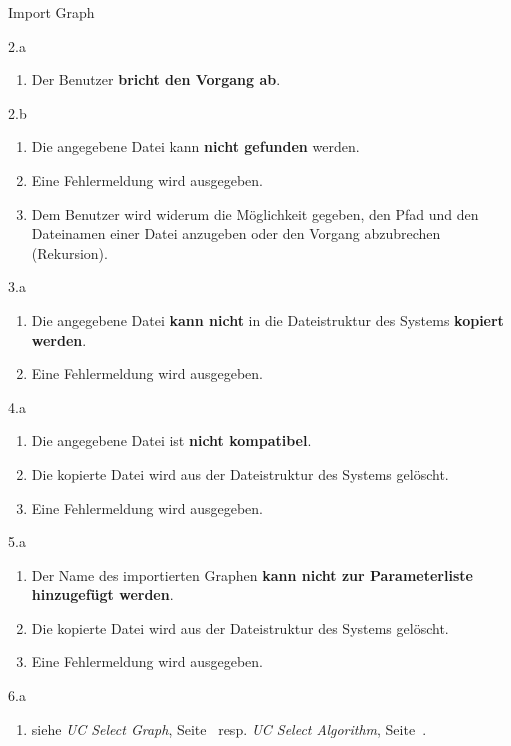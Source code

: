 \begin{usecase}{Import Graph}
{\begin{enumerate}
		    \end{enumerate}
	    \item[2.a]
		    \begin{enumerate}
			\item Der Benutzer \textbf{bricht den Vorgang ab}.
		    \end{enumerate}
	    \item[2.b]
		    \begin{enumerate}
			\item Die angegebene Datei kann \textbf{nicht gefunden} werden.
			\item Eine Fehlermeldung wird ausgegeben.
			\item Dem Benutzer wird widerum die M\"oglichkeit gegeben, den Pfad und den Dateinamen einer Datei anzugeben oder den Vorgang abzubrechen (Rekursion).
		    \end{enumerate}
	    \item[3.a]
		    \begin{enumerate}
			\item Die angegebene Datei \textbf{kann nicht} in die Dateistruktur des Systems \textbf{kopiert werden}.
			\item Eine Fehlermeldung wird ausgegeben.
		    \end{enumerate}
	    \item[4.a]
		    \begin{enumerate}
			\item Die angegebene Datei ist \textbf{nicht kompatibel}.
			\item Die kopierte Datei wird aus der Dateistruktur des Systems gel\"oscht.
			\item Eine Fehlermeldung wird ausgegeben.
		    \end{enumerate}
	    \item[5.a]
		    \begin{enumerate}
			\item Der Name des importierten Graphen \textbf{kann nicht zur Parameterliste hinzugef\"ugt werden}.
			\item Die kopierte Datei wird aus der Dateistruktur des Systems gel\"oscht.
			\item Eine Fehlermeldung wird ausgegeben.
		    \end{enumerate}
	    \item[6.a]
		    \begin{enumerate}
			\item siehe \textit{UC Select Graph}, Seite~\pageref{uc:Select Graph} resp. \textit{UC Select Algorithm}, Seite~\pageref{uc:Select Algorithm}.
		    \end{enumerate}
    }
\end{usecase}
